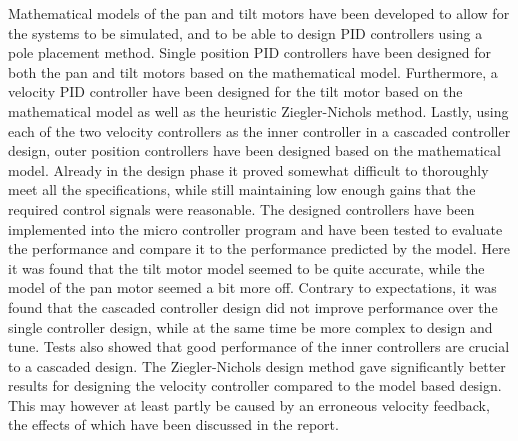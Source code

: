 \documentclass[../../main.tex]{subfiles}
\begin{document}
Mathematical models of the pan and tilt motors have been developed to allow for the systems to be simulated, and to be able to design PID controllers using a pole placement method.
Single position PID controllers have been designed for both the pan and tilt motors based on the mathematical model. Furthermore, a velocity PID controller have been designed for the tilt motor based on the mathematical model as well as the heuristic Ziegler-Nichols method. Lastly, using each of the two velocity controllers as the inner controller in a cascaded controller design, outer position controllers have been designed based on the mathematical model. Already in the design phase it proved somewhat difficult to thoroughly meet all the specifications, while still maintaining low enough gains that the required control signals were reasonable.
The designed controllers have been implemented into the micro controller program and have been tested to evaluate the performance and compare it to the performance predicted by the model.
Here it was found that the tilt motor model seemed to be quite accurate, while the model of the pan motor seemed a bit more off.
Contrary to expectations, it was found that the cascaded controller design did not improve performance over the single controller design, while at the same time be more complex to design and tune. Tests also showed that good performance of the inner controllers are crucial to a cascaded design. The Ziegler-Nichols design method gave significantly better results for designing the velocity controller compared to the model based design. This may however at least partly be caused by an erroneous velocity feedback, the effects of which have been discussed in the report.

\end{document}
